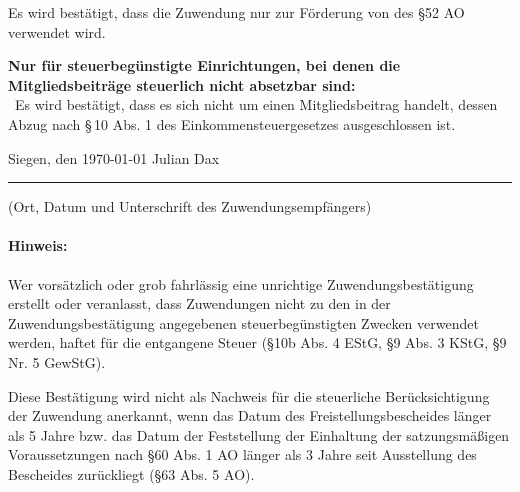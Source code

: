 \documentclass[11pt,ngerman]{scrartcl}
\newcommand{\unmychecked}{\scalebox{1.5}{\Square}}
\begin{document}
\begin{mdframed}[style=MyFormStyle]%
\footnotesize Es wird bestätigt, dass die Zuwendung nur zur Förderung von  des \S52 AO verwendet wird. \vspace{0.5em}

\textbf{Nur für steuerbegünstigte Einrichtungen, bei denen die Mitgliedsbeiträge steuerlich nicht absetzbar sind:} \\
\unmychecked\, Es wird bestätigt, dass es sich nicht um einen Mitgliedsbeitrag handelt, dessen Abzug nach \S\,10 Abs. 1 des Einkommensteuergesetzes ausgeschlossen ist. 

\end{mdframed} 


\vspace*{2.5em} 

Siegen, den \today \hspace*{20em} Julian Dax

\hrule

\vspace*{0.5em} (Ort, Datum und Unterschrift des Zuwendungsempfängers) 

\paragraph{Hinweis:} Wer vorsätzlich oder grob fahrlässig eine unrichtige Zuwendungsbestätigung erstellt oder veranlasst, dass 
Zuwendungen nicht zu den in der Zuwendungsbestätigung angegebenen steuerbegünstigten Zwecken verwendet 
werden, haftet für die entgangene Steuer (\S 10b Abs. 4 EStG, \S 9 Abs. 3 KStG, \S 9 Nr. 5 GewStG). 

Diese Bestätigung wird nicht als Nachweis für die steuerliche Berücksichtigung der Zuwendung anerkannt, wenn das Datum des Freistellungsbescheides länger als 5 Jahre bzw. das Datum der Feststellung der Einhaltung der satzungsmäßigen Voraussetzungen nach \S 60 Abs. 1 AO länger als 3 Jahre seit Ausstellung des Bescheides zurückliegt (\S63 Abs. 5 AO). 
\end{document}
